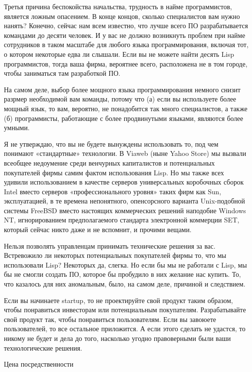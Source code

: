 \documentclass[ebook,12pt,oneside,openany]{memoir}
\begin{document}
Третья причина беспокойства начальства, трудность в найме
программистов, является ложным опасением. В конце концов, сколько
специалистов вам нужно нанять? Конечно, сейчас нам всем известно, что
лучше всего ПО разрабатывается командами до десяти человек. И у вас не
должно возникнуть проблем при найме сотрудников в таком масштабе для
любого языка программирования, включая тот, о котором некоторые едва
ли слышали. Если вы не можете найти десять Lisp программистов, тогда
ваша фирма, вероятнее всего, расположена не в том городе, чтобы
заниматься там разработкой ПО.

На самом деле, выбор более мощного языка программирования немного
снизит разрмер необходимой вам команды, потому что (а) если вы
используете более мощный язык, то вам, вероятно, не понадобится так
много специалистов, а также (б) программисты, работающие с более
продвинутыми языками, являются более умными.

Я не утверждаю, что вы не будете вынуждены использовать то, под чем
понимают «стандартные» технологии. В Viaweb (ныне Yahoo Store) мы
вызвали всеобщее недоумение среди венчурных капиталистов и
потенциальных покупателей фирмы самим фактом использования Lisp. Но мы
также всех удивили использованием в качестве серверов универсальных
коробочных сборок Intel вместо серверов «профессионального уровня»
таких фирм как Sun, эксплуатацией, в те времена непонятного,
опенсорсного варианта Unix-подобной системы FreeBSD вместо настоящих
коммерческих решений наподобие Windows NT, игнорированием
предполагаемого стандарта электронной коммерции SET, который сейчас
никто даже и не вспомнит, и прочими вещами.

Нельзя позволять управленцам принимать технические решения за вас.
Встревожило ли некоторых потенциальных покупателей фирмы то, что мы
использовали Lisp? Некоторых да, слегка. Но если бы мы не работали с
Lisp, мы бы не смогли создать ПО, которое бы пробудило в них желание
нас купить. То, что казалось для них аномальным, было, на самом деле,
причиной и следствием.

Если вы начинаете startup, то не проектируйте свой продукт таким
образом, чтобы понравиться инвесторам или потенциальным покупателям.
Разрабатывайте свой продукт так, чтобы понравиться пользователям. Если
вы завоюете пользователей, то все остальное приложится. А если этого
сделать не удастся, то никому не будет и дела до того, насколько
угодно правоверными были ваши технологические решения.

Цена посредственности
\end{document}
